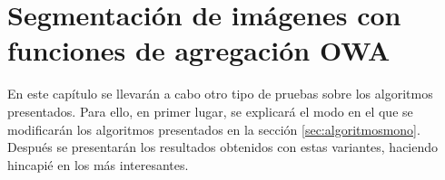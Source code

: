 \documentclass[main]{subfiles}
\begin{document}
\chapter{Segmentación de imágenes con funciones de agregación OWA}

En este capítulo se llevarán a cabo otro tipo de pruebas sobre los algoritmos presentados. Para ello, en primer lugar, se explicará el modo en el que se modificarán los algoritmos presentados en la sección \ref{sec:algoritmosmono}. Después se presentarán los resultados obtenidos con estas variantes, haciendo hincapié en los más interesantes.

%


\end{document}
